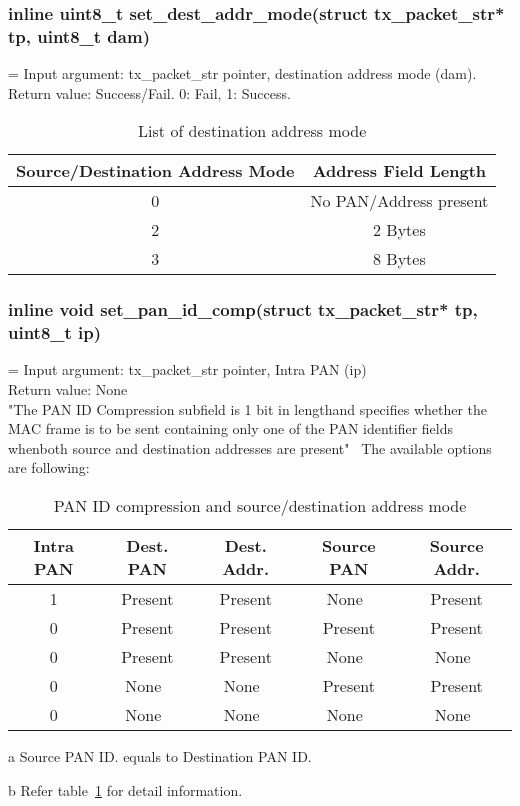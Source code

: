 \subsubsection{inline uint8\_t set\_dest\_addr\_mode(struct tx\_packet\_str* tp, uint8\_t dam)}
\hangindent=\parindent
{}
Input argument: tx\_packet\_str pointer, destination address mode (dam).\\
Return value: Success/Fail. 0: Fail, 1: Success.\\
\begin{table}[h]
\centering
	\begin{tabular}{|c|c|}
	\hline
	{\bf Source/Destination Address Mode} & {\bf Address Field Length}\\ \hline
	0 & No PAN/Address present\\ \hline
	2 & 2 Bytes\\ \hline
	3 & 8 Bytes\\ \hline
	\end{tabular}
	\caption{List of destination address mode}
	\label{tab:address_mode}
\end{table}

\subsubsection{inline void set\_pan\_id\_comp(struct tx\_packet\_str* tp, uint8\_t ip)}
\hangindent=\parindent
{}
Input argument: tx\_packet\_str pointer, Intra PAN (ip)\\
Return value: None\\
"The PAN ID Compression subfield is 1 bit in lengthand specifies whether the MAC frame is to 
be sent containing only one of the PAN identifier fields whenboth source and destination 
addresses are present"~\cite{802.15.4.standard}
The available options are following:
\begin{table*}[h]
\centering
\begin{threeparttable}
	\begin{tabular}{|c|c|c|c|c|}
	\hline
	{\bf Intra PAN} & {\bf Dest. PAN} & {\bf Dest. Addr.} & {\bf Source PAN} & {\bf Source Addr.}\\ \hline
	1 & Present			& Present			& None~\tnote{a}	& Present\\ \hline
	0 & Present			& Present			& Present			& Present\\ \hline
	0 & Present			& Present			& None~\tnote{b}	& None~\tnote{b}\\ \hline
	0 & None~\tnote{b}	& None~\tnote{b}	& Present			& Present\\ \hline
	0 & None~\tnote{b}	& None~\tnote{b}	& None~\tnote{b}	& None~\tnote{b}\\ \hline
	\end{tabular}
	\begin{tablenotes}
		\item [a] Source PAN ID. equals to Destination PAN ID.
		\item [b] Refer table~\ref{tab:address_mode} for detail information.
	\end{tablenotes}
\end{threeparttable}
	\caption{PAN ID compression and source/destination address mode}
\end{table*}

